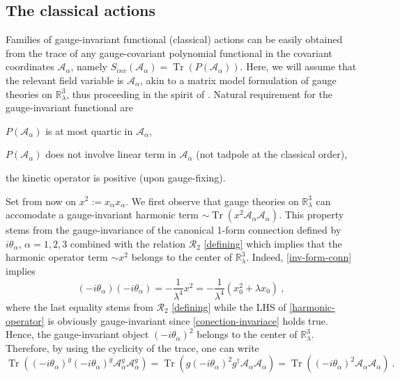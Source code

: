 \documentclass[a4paper,11pt,twoside]{article}
\makeatletter
\numberwithin{equation}{section}
\DeclareMathOperator{\tr}{Tr}
\newcommand{\labitem}[2]{\def\@itemlabel{\textbf{#1}}\item\def\@currentlabel{#1}\label{#2}}
\theoremstyle{nonumberplain}
\newcounter{and}
\makeatother
\begin{document}

\subsection{The classical actions}

Families of gauge-invariant functional (classical) actions can be easily obtained from the trace of any gauge-covariant polynomial functional in the covariant coordinates $\mathcal{A}_\alpha$, namely $S_{inv}(\mathcal{A}_\alpha)=\tr\left(P(\mathcal{A}_\alpha)\right)$. Here, we will assume that the relevant field variable is $\mathcal{A}_\alpha$, akin to a matrix model formulation of gauge theories on $\mathbb{R}^3_\lambda$, thus proceeding in the spirit of \cite{MVW13}. Natural requirement for the gauge-invariant functional are%
%
\begin{description}
\labitem{(i)}{(i)} $P(\mathcal{A}_\alpha)$ is at most quartic in $\mathcal{A}_\alpha$,
\labitem{(ii)}{(ii)} $P(\mathcal{A}_\alpha)$ does not involve linear term in $\mathcal{A}_\alpha$ (not tadpole at the classical order),
\labitem{(iii)}{(iii)} the kinetic operator is positive (upon gauge-fixing).
\end{description}
%
Set from now on $x^2 := x_\alpha x_\alpha$. We first observe that gauge theories on $\mathbb{R}^3_\lambda$ can accomodate a gauge-invariant harmonic term $\sim\tr(x^2\mathcal{A}_\alpha \mathcal{A}_\alpha)$. This property stems from the gauge-invariance of the canonical 1-form connection defined by $i\theta_\alpha$, $\alpha=1,2,3$ combined with the relation $\mathcal{R}_2$ \eqref{defining} which implies that the harmonic operator term $\sim x^2$ belongs to the center of $\mathbb{R}^3_\lambda$. Indeed, \eqref{inv-form-conn} implies%
%
\begin{equation}
(-i\theta_\alpha)(-i\theta_\alpha) = -\frac{1}{\lambda^4}x^2 = -\frac{1}{\lambda^4}(x_0^2+\lambda x_0) \ , \label{harmonic-operator}
\end{equation}
%
where the last equality stems from $\mathcal{R}_2$ \eqref{defining} while the LHS of \eqref{harmonic-operator} is obviously gauge-invariant since \eqref{conection-invariace} holds true. Hence, the gauge-invariant object $(-i\theta_\alpha)^2$ belongs to the center of $\mathbb{R}^3_\lambda$. Therefore, by using the cyclicity of the trace, one can write%
%
\begin{equation}
\tr\left( (-i\theta_\alpha)^g (-i\theta_\alpha)^g \mathcal{A}^g_\alpha \mathcal{A}^g_\alpha \right) = 
\tr\left( g (-i\theta_\alpha)^2 g^\dag \mathcal{A}_\alpha \mathcal{A}_\alpha \right) = 
\tr\left( (-i\theta_\alpha)^2 \mathcal{A}_\alpha \mathcal{A}_\alpha \right) \ . 
\label{harm-inv-dem}
\end{equation}
\end{document}
